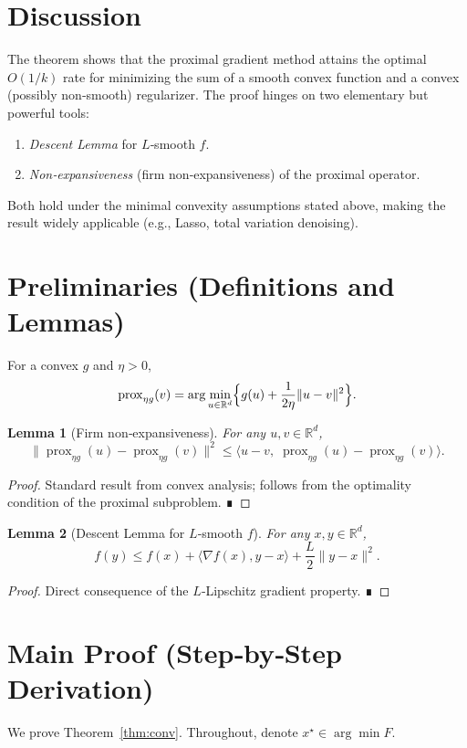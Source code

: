 \documentclass{article}
\newtheorem{lemma}{Lemma}
\newcommand{\prox}{\operatorname{prox}}
\newcommand{\R}{\mathbb{R}}
\begin{document}
\section*{Discussion}
The theorem shows that the proximal gradient method attains the optimal $O(1/k)$ rate for minimizing the sum of a smooth convex function and a convex (possibly non‑smooth) regularizer. The proof hinges on two elementary but powerful tools:
\begin{enumerate}
\item \emph{Descent Lemma} for $L$‑smooth $f$.
\item \emph{Non‑expansiveness} (firm non‑expansiveness) of the proximal operator.
\end{enumerate}
Both hold under the minimal convexity assumptions stated above, making the result widely applicable (e.g., Lasso, total variation denoising).

\newpage

\section*{Preliminaries (Definitions and Lemmas)}
\begin{definition}
For a convex $g$ and $\eta>0$,
\[
\prox_{\eta g}(v)=\arg\min_{u\in\R^{d}}\Bigl\{g(u)+\frac{1}{2\eta}\|u-v\|^{2}\Bigr\}.
\]
\end{definition}
\begin{lemma}[Firm non‑expansiveness]\label{lem:firm}
For any $u,v\in\R^{d}$,
\[
\|\prox_{\eta g}(u)-\prox_{\eta g}(v)\|^{2}
\le \langle u-v,\;\prox_{\eta g}(u)-\prox_{\eta g}(v)\rangle .
\tag{3}
\]
\end{lemma}
\begin{proof}
Standard result from convex analysis; follows from the optimality condition of the proximal subproblem. ∎
\end{proof}
\begin{lemma}[Descent Lemma for $L$‑smooth $f$]\label{lem:descent}
For any $x,y\in\R^{d}$,
\[
f(y)\le f(x)+\langle\nabla f(x),y-x\rangle+\frac{L}{2}\|y-x\|^{2}.
\tag{4}
\]
\end{lemma}
\begin{proof}
Direct consequence of the $L$‑Lipschitz gradient property. ∎
\end{proof}

\section*{Main Proof (Step‑by‑Step Derivation)}
We prove Theorem~\ref{thm:conv}. Throughout, denote $x^{\star}\in\arg\min F$.
\end{document}
